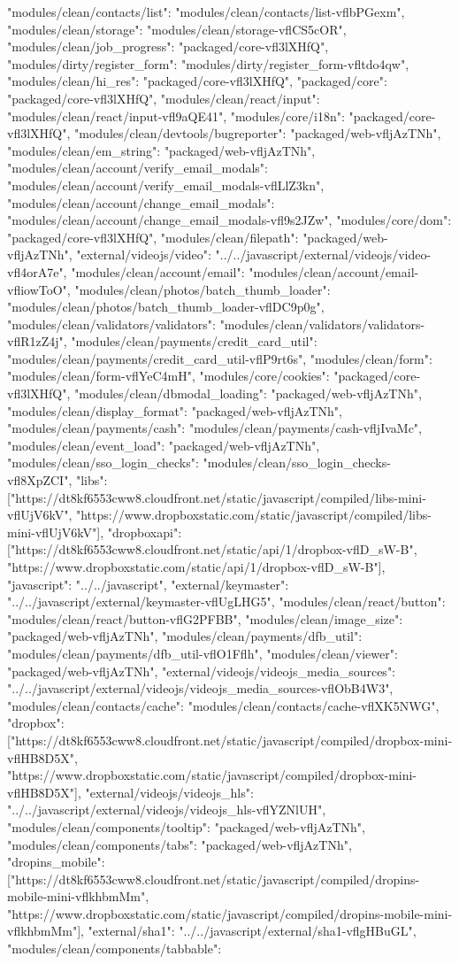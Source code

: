 {"modules/clean/contacts/list": "modules/clean/contacts/list-vflbPGexm", "modules/clean/storage": "modules/clean/storage-vflCS5cOR", "modules/clean/job_progress": "packaged/core-vfl3lXHfQ", "modules/dirty/register_form": "modules/dirty/register_form-vfltdo4qw", "modules/clean/hi_res": "packaged/core-vfl3lXHfQ", "packaged/core": "packaged/core-vfl3lXHfQ", "modules/clean/react/input": "modules/clean/react/input-vfl9aQE41", "modules/core/i18n": "packaged/core-vfl3lXHfQ", "modules/clean/devtools/bugreporter": "packaged/web-vfljAzTNh", "modules/clean/em_string": "packaged/web-vfljAzTNh", "modules/clean/account/verify_email_modals": "modules/clean/account/verify_email_modals-vflLlZ3kn", "modules/clean/account/change_email_modals": "modules/clean/account/change_email_modals-vfl9s2JZw", "modules/core/dom": "packaged/core-vfl3lXHfQ", "modules/clean/filepath": "packaged/web-vfljAzTNh", "external/videojs/video": "../../javascript/external/videojs/video-vfl4orA7e", "modules/clean/account/email": "modules/clean/account/email-vfliowToO", "modules/clean/photos/batch_thumb_loader": "modules/clean/photos/batch_thumb_loader-vflDC9p0g", "modules/clean/validators/validators": "modules/clean/validators/validators-vflR1zZ4j", "modules/clean/payments/credit_card_util": "modules/clean/payments/credit_card_util-vflP9rt6s", "modules/clean/form": "modules/clean/form-vflYeC4mH", "modules/core/cookies": "packaged/core-vfl3lXHfQ", "modules/clean/dbmodal_loading": "packaged/web-vfljAzTNh", "modules/clean/display_format": "packaged/web-vfljAzTNh", "modules/clean/payments/cash": "modules/clean/payments/cash-vfljIvaMc", "modules/clean/event_load": "packaged/web-vfljAzTNh", "modules/clean/sso_login_checks": "modules/clean/sso_login_checks-vfl8XpZCI", "libs": ["https://dt8kf6553cww8.cloudfront.net/static/javascript/compiled/libs-mini-vflUjV6kV", "https://www.dropboxstatic.com/static/javascript/compiled/libs-mini-vflUjV6kV"], "dropboxapi": ["https://dt8kf6553cww8.cloudfront.net/static/api/1/dropbox-vflD_sW-B", "https://www.dropboxstatic.com/static/api/1/dropbox-vflD_sW-B"], "javascript": "../../javascript", "external/keymaster": "../../javascript/external/keymaster-vflUgLHG5", "modules/clean/react/button": "modules/clean/react/button-vflG2PFBB", "modules/clean/image_size": "packaged/web-vfljAzTNh", "modules/clean/payments/dfb_util": "modules/clean/payments/dfb_util-vflO1Fflh", "modules/clean/viewer": "packaged/web-vfljAzTNh", "external/videojs/videojs_media_sources": "../../javascript/external/videojs/videojs_media_sources-vflObB4W3", "modules/clean/contacts/cache": "modules/clean/contacts/cache-vflXK5NWG", "dropbox": ["https://dt8kf6553cww8.cloudfront.net/static/javascript/compiled/dropbox-mini-vflHB8D5X", "https://www.dropboxstatic.com/static/javascript/compiled/dropbox-mini-vflHB8D5X"], "external/videojs/videojs_hls": "../../javascript/external/videojs/videojs_hls-vflYZNlUH", "modules/clean/components/tooltip": "packaged/web-vfljAzTNh", "modules/clean/components/tabs": "packaged/web-vfljAzTNh", "dropins_mobile": ["https://dt8kf6553cww8.cloudfront.net/static/javascript/compiled/dropins-mobile-mini-vflkhbmMm", "https://www.dropboxstatic.com/static/javascript/compiled/dropins-mobile-mini-vflkhbmMm"], "external/sha1": "../../javascript/external/sha1-vflgHBuGL", "modules/clean/components/tabbable": }
